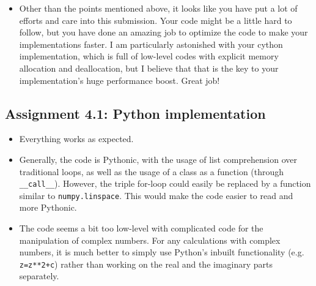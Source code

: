 \documentclass[a4paper]{article}
\begin{document}
\begin{itemize}
  \item Other than the points mentioned above, it looks like you have put a lot of efforts and care into this submission. Your code might be a little hard to follow, but you have done an amazing job to optimize the code to make your implementations faster. I am particularly astonished with your cython implementation, which is full of low-level codes with explicit memory allocation and deallocation, but I believe that that is the key to your implementation's huge performance boost. Great job!

\end{itemize}


\subsection*{Assignment 4.1: Python implementation}
\begin{itemize}
  \item Everything works as expected. 
  
  \item Generally, the code is Pythonic, with the usage of list comprehension over traditional loops, as well as the usage of a class as a function (through \texttt{__call__}). However, the triple for-loop could easily be replaced by a function similar to \texttt{numpy.linspace}. This would make the code easier to read and more Pythonic.
  
  \item The code seems a bit too low-level with complicated code for the manipulation of complex numbers. For any calculations with complex numbers, it is much better to simply use Python's inbuilt functionality (e.g. \texttt{z=z**2+c}) rather than working on the real and the imaginary parts separately.
\end{itemize}

\end{document}
